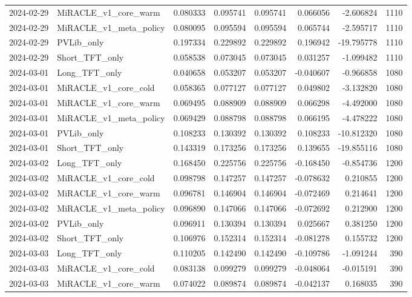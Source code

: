 \begin{tabular}{llrrrrrr}
2024-02-29 & MiRACLE_v1_core_warm & 0.080333 & 0.095741 & 0.095741 & 0.066056 & -2.606824 & 1110 \\
2024-02-29 & MiRACLE_v1_meta_policy & 0.080095 & 0.095594 & 0.095594 & 0.065744 & -2.595717 & 1110 \\
2024-02-29 & PVLib_only & 0.197334 & 0.229892 & 0.229892 & 0.196942 & -19.795778 & 1110 \\
2024-02-29 & Short_TFT_only & 0.058538 & 0.073045 & 0.073045 & 0.031257 & -1.099482 & 1110 \\
2024-03-01 & Long_TFT_only & 0.040658 & 0.053207 & 0.053207 & -0.040607 & -0.966858 & 1080 \\
2024-03-01 & MiRACLE_v1_core_cold & 0.058365 & 0.077127 & 0.077127 & 0.049802 & -3.132820 & 1080 \\
2024-03-01 & MiRACLE_v1_core_warm & 0.069495 & 0.088909 & 0.088909 & 0.066298 & -4.492000 & 1080 \\
2024-03-01 & MiRACLE_v1_meta_policy & 0.069429 & 0.088798 & 0.088798 & 0.066195 & -4.478222 & 1080 \\
2024-03-01 & PVLib_only & 0.108233 & 0.130392 & 0.130392 & 0.108233 & -10.812320 & 1080 \\
2024-03-01 & Short_TFT_only & 0.143319 & 0.173256 & 0.173256 & 0.139655 & -19.855116 & 1080 \\
2024-03-02 & Long_TFT_only & 0.168450 & 0.225756 & 0.225756 & -0.168450 & -0.854736 & 1200 \\
2024-03-02 & MiRACLE_v1_core_cold & 0.098798 & 0.147257 & 0.147257 & -0.078632 & 0.210855 & 1200 \\
2024-03-02 & MiRACLE_v1_core_warm & 0.096781 & 0.146904 & 0.146904 & -0.072469 & 0.214641 & 1200 \\
2024-03-02 & MiRACLE_v1_meta_policy & 0.096890 & 0.147066 & 0.147066 & -0.072692 & 0.212900 & 1200 \\
2024-03-02 & PVLib_only & 0.096911 & 0.130394 & 0.130394 & 0.025667 & 0.381250 & 1200 \\
2024-03-02 & Short_TFT_only & 0.106976 & 0.152314 & 0.152314 & -0.081278 & 0.155732 & 1200 \\
2024-03-03 & Long_TFT_only & 0.110205 & 0.142490 & 0.142490 & -0.109786 & -1.091244 & 390 \\
2024-03-03 & MiRACLE_v1_core_cold & 0.083138 & 0.099279 & 0.099279 & -0.048064 & -0.015191 & 390 \\
2024-03-03 & MiRACLE_v1_core_warm & 0.074022 & 0.089874 & 0.089874 & -0.042137 & 0.168035 & 390 \\

\end{tabular}
